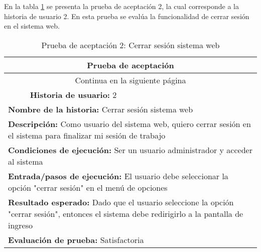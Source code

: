 En la tabla \ref{tab:prueba-2} se presenta la prueba de aceptación 2, la cual corresponde a la historia de usuario 2.
En esta prueba se evalúa la funcionalidad de cerrar sesión en el sistema web.

\begin{longtable}{|p{6.7cm}|p{6.7cm}|}
    \caption{Prueba de aceptación 2: Cerrar sesión sistema web} \label{tab:prueba-2}
    \\
    \hline
    \multicolumn{2}{|c|}{\textbf{Prueba de aceptación}}                                                                                                                                \\
    \hline

    \endfirsthead

    \hline
    \endhead

    \hline
    \multicolumn{2}{|c|}{{Continua en la siguiente página}}                                                                                                                            \\
    \hline
    \endfoot

    \hline
    \endlastfoot
    \multicolumn{1}{|p{6.7cm}|}{\textbf{Número} 2 } & \multicolumn{1}{|p{6.7cm}|}{\textbf{Historia de usuario:} 2}                                                                     \\
    \hline
    \multicolumn{2}{|p{13.4cm}|}{\textbf{Nombre de la historia:} Cerrar sesión sistema web }                                                                                           \\
    \hline
    \multicolumn{2}{|p{13.4cm}|}{\textbf{Descripción:}  Como usuario del sistema web, quiero cerrar sesión en el sistema para finalizar mi sesión de trabajo}                          \\
    \hline
    \multicolumn{2}{|p{13.4cm}|}{\textbf{Condiciones de ejecución:} Ser un usuario administrador y acceder al sistema}                                                                 \\
    \hline
    \multicolumn{2}{|p{13.4cm}|}{\textbf{Entrada/pasos de ejecución:} El usuario debe seleccionar la opción "cerrar sesión" en el menú de opciones}                                    \\
    \hline
    \multicolumn{2}{|p{13.4cm}|}{\textbf{Resultado esperado:} Dado que el usuario seleccione la opción "cerrar sesión", entonces el sistema debe redirigirlo a la pantalla de ingreso} \\
    \hline
    \multicolumn{2}{|p{13.4cm}|}{\textbf{Evaluación de prueba:} Satisfactoria}                                                                                                         \\
    \hline
\end{longtable}

